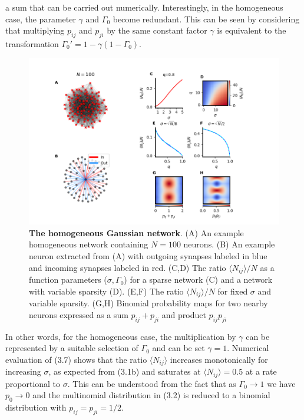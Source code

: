 \documentclass{ucetd}
\begin{document}
a sum that can be carried out numerically. Interestingly, in the homogeneous case, the parameter $\gamma$ and $\Gamma_{0}$ become redundant. This can be seen by considering that multiplying $p_{ij}$ and $p_{ji}$ by the same constant factor $\gamma$ is equivalent to the transformation $\Gamma_{0}' = 1-\gamma(1-\Gamma_{0})$. 

\begin{figure}[t!]
\centering
\includegraphics[width=175mm]{fig_8}
\caption{\textbf{The homogeneous Gaussian network}. (A) An example homogeneous network containing $N=100$ neurons. (B) An example neuron extracted from (A) with outgoing synapses labeled in blue and incoming synapses labeled in red. (C,D) The ratio $\langle N_{ij}\rangle/N$ as a function parameters ($\sigma, \Gamma_{0}$) for a sparse network (C) and a network with variable sparsity (D). (E,F) The ratio $\langle N_{ij}\rangle/N$ for fixed $\sigma$ and variable sparsity. (G,H) Binomial probability maps for two nearby neurons expressed as a sum $p_{ij}+p_{ji}$ and product $p_{ij}p_{ji}$}
\end{figure}

In other words, for the homogeneous case, the multiplication by $\gamma$ can be represented by a suitable selection of $\Gamma_{0}$ and can be set $\gamma=1$. Numerical evaluation of (3.7) shows that the ratio $\langle N_{ij}\rangle$ increases monotonically for increasing $\sigma$, as expected from (3.1b) and saturates at $\langle N_{ij}\rangle = 0.5$ at a rate proportional to $\sigma$. This can be understood from the fact that as $\Gamma_{0} \rightarrow 1$ we have $p_{0} \rightarrow 0$ and the multinomial distribution in (3.2) is reduced to a binomial distribution with $p_{ij} = p_{ji} = 1/2$. 
\end{document}
